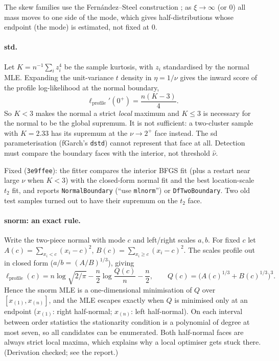 \documentclass[11pt]{article}
\newcommand{\code}[1]{\texttt{#1}}
\theoremstyle{plain}
\theoremstyle{definition}
\theoremstyle{remark}
\begin{document}
The skew families use the Fern\'andez--Steel construction \cite{fs1998}; as
$\xi\to\infty$ (or $0$) all mass moves to one side of the mode, which gives
half-distributions whose endpoint (the mode) is estimated, not fixed at $0$.

\paragraph{std.} Let $K = n^{-1}\sum_i z_i^4$ be the sample kurtosis, with
$z_i$ standardised by the normal MLE. Expanding the unit-variance $t$
density in $\eta = 1/\nu$ gives the inward score of the profile
log-likelihood at the normal boundary,
\[
  \ell_{\mathrm{profile}}'(0^+) = \frac{n(K-3)}{4}.
\]
So $K < 3$ makes the normal a strict \emph{local} maximum and $K \le 3$ is
necessary for the normal to be the global supremum. It is not sufficient: a
two-cluster sample with $K = 2.33$ has its supremum at the $\nu\to2^+$ face
instead. The sd parameterisation (fGarch's \code{dstd}) cannot represent
that face at all. Detection must compare the boundary faces with the
interior, not threshold $\hat\nu$.

Fixed (\code{3e9ffee}): the fitter compares the interior BFGS fit (plus a
restart near large $\nu$ when $K < 3$) with the closed-form normal fit and
the best location-scale $t_2$ fit, and reports \code{NormalBoundary}
(``use \code{mlnorm}'') or \code{DfTwoBoundary}. Two old test samples turned
out to have their supremum on the $t_2$ face.

\paragraph{snorm: an exact rule.}\label{sec:snorm} Write the two-piece normal
with mode $c$ and left/right scales $a, b$. For fixed $c$ let
$A(c) = \sum_{x_i<c}(x_i-c)^2$, $B(c) = \sum_{x_i \ge c}(x_i-c)^2$. The
scales profile out in closed form ($a/b = (A/B)^{1/3}$), giving
\[
  \ell_{\mathrm{profile}}(c) = n\log\sqrt{2/\pi} - \frac n2 \log\frac{Q(c)}{n}
  - \frac n2, \qquad Q(c) = \bigl(A(c)^{1/3} + B(c)^{1/3}\bigr)^3 .
\]
Hence the snorm MLE is a one-dimensional minimisation of $Q$ over
$[x_{(1)}, x_{(n)}]$, and the MLE escapes exactly when $Q$ is minimised only
at an endpoint ($x_{(1)}$: right half-normal; $x_{(n)}$: left half-normal).
On each interval between order statistics the stationarity condition is a
polynomial of degree at most seven, so all candidates can be enumerated.
Both half-normal faces are always strict local maxima, which explains why a
local optimiser gets stuck there. (Derivation checked; see the report.)
\end{document}
